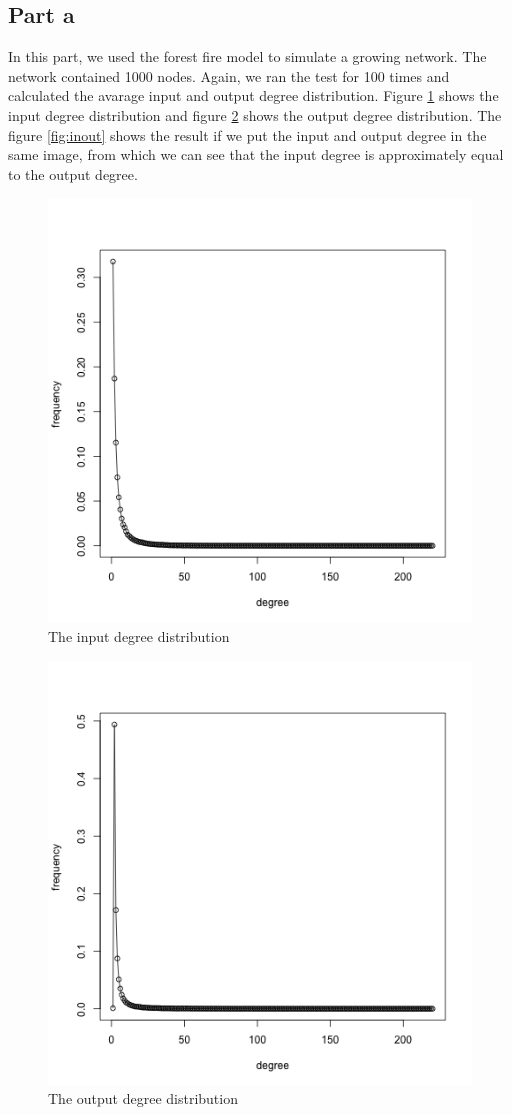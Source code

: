 \documentclass{article}
\begin{document}
\subsection{Part a}
In this part, we used the forest fire model to simulate a growing network. The network contained 1000 nodes. Again, we ran the test for 100 times and calculated the avarage input and output degree distribution. Figure \ref{fig:in} shows the input degree distribution and figure \ref{fig:out} shows the output degree distribution. The figure \ref{fig:inout} shows the result if we put the input and output degree in the same image, from which we can see that the input degree is approximately equal to the output degree.
\begin{figure}[htbp]
\centering
\includegraphics[width=.6\textwidth]{degree_in.png}
\caption{The input degree distribution}
\label{fig:in}
\end{figure}

\begin{figure}[htbp]
\centering
\includegraphics[width=.6\textwidth]{degree_out.png}
\caption{The output degree distribution}
\label{fig:out}
\end{figure}
\end{document}
